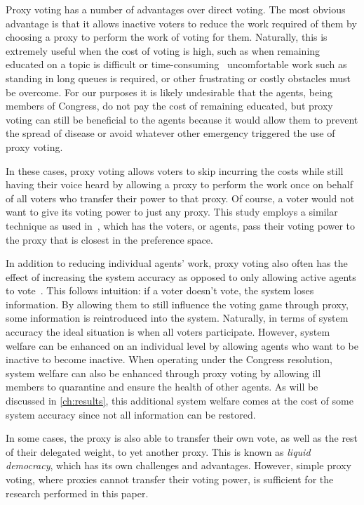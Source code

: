 Proxy voting has a number of advantages over direct voting.
The most obvious advantage is that it allows inactive voters to reduce the work
required of them by choosing a proxy to perform the work of voting for them.
Naturally, this is extremely useful when the cost of voting is high, such as
when remaining educated on a topic is difficult or
time-consuming~\cite{Mueller1972} uncomfortable work such as standing in
long queues is required, or other frustrating or costly obstacles must be overcome.
For our purposes it is likely undesirable that the agents, being members of Congress,
do not pay the cost of remaining educated, but proxy voting can still be beneficial
to the agents because it would allow them to prevent the spread of disease or avoid
whatever other emergency triggered the use of proxy voting.

In these cases, proxy voting allows voters to skip incurring the costs while
still having their voice heard by allowing a proxy to perform the work once on
behalf of all voters who transfer their power to that proxy.
Of course, a voter would not want to give its voting power to just any proxy.
This study employs a similar technique as used in~\cite{Cohensius2017}, which has the
voters, or agents, pass their voting power to the proxy that is closest in the
preference space.

In addition to reducing individual agents' work, proxy voting also often has
the effect of increasing the system accuracy as opposed to only allowing active
agents to vote~\cite{Cohensius2017}.
This follows intuition: if a voter doesn't vote, the system loses information.
By allowing them to still influence the voting game through proxy, some information
is reintroduced into the system.
Naturally, in terms of system accuracy the ideal situation is when all voters
participate.
However, system welfare can be enhanced on an individual level by allowing agents
who want to be inactive to become inactive.
When operating under the Congress resolution, system welfare can also be enhanced
through proxy voting by allowing ill members to quarantine and ensure the health
of other agents.
As will be discussed in \autoref{ch:results}, this additional system welfare comes at
the cost of some system accuracy since not all information can be restored.

In some cases, the proxy is also able to transfer their own vote, as well as the rest of
their delegated weight, to yet another proxy.
This is known as \textit{liquid democracy}, which has its own challenges and
advantages.
However, simple proxy voting, where proxies cannot transfer their voting power,
is sufficient for the research performed in this paper.

